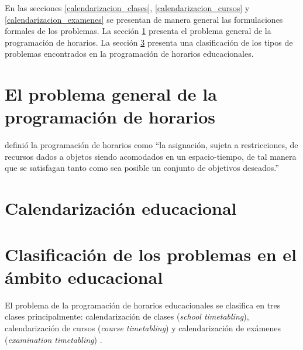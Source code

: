 \documentclass[draft,12pt,headsepline,footsepline,paper=letter]{scrreprt}
\begin{document}
En las secciones \ref{calendarizacion_clases}, \ref{calendarizacion_cursos} y \ref{calendarizacion_examenes} se presentan de manera general las formulaciones formales de los problemas.
La sección \ref{problema_general_programacion_horarios} presenta el problema general de la programación de horarios. La sección \ref{clasificacion_problemas} presenta una clasificación de los tipos de problemas encontrados en la programación de horarios educacionales. 
\section{El problema general de la programación de horarios}
\label{problema_general_programacion_horarios}

\citet[p.~53]{wren95scheduling-timetabling} definió la programación de horarios como “la asignación, sujeta a restricciones, de recursos dados a objetos siendo acomodados en un espacio-tiempo, de tal manera que se satisfagan tanto como sea posible un conjunto de objetivos deseados.”

\section{Calendarización educacional} %
\label{calendarizacion_educacional}


\section{Clasificación de los problemas en el ámbito educacional}
\label{clasificacion_problemas}

El problema de la programación de horarios educacionales se clasifica en tres clases principalmente:
calendarización de clases (\textit{school timetabling}),
calendarización de cursos (\textit{course timetabling}) y
calendarización de exámenes (\textit{examination timetabling}) \citep[p.~88]{schaerf99a-survey-of-automated}.
\end{document}
